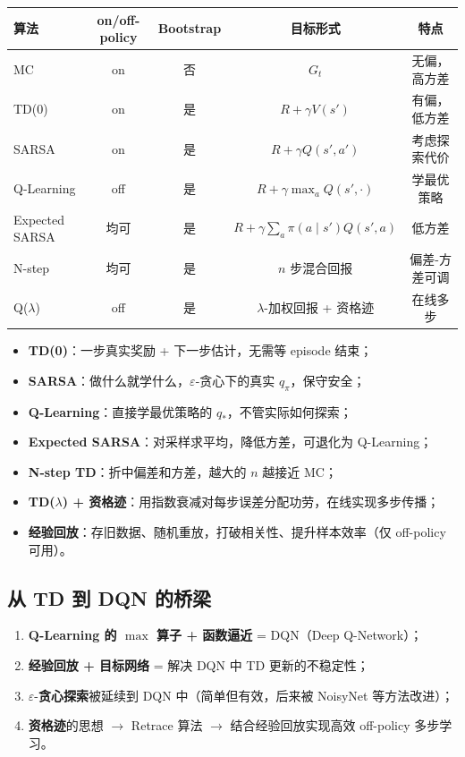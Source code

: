 \documentclass{article}
\begin{document}
\begin{center}
\begin{tabular}{lcccc}
\toprule
算法 & on/off-policy & Bootstrap & 目标形式 & 特点 \\
\midrule
MC & on & 否 & $G_t$ & 无偏，高方差 \\
TD(0) & on & 是 & $R+\gamma V(s')$ & 有偏，低方差 \\
SARSA & on & 是 & $R+\gamma Q(s',a')$ & 考虑探索代价 \\
Q-Learning & off & 是 & $R+\gamma\max_a Q(s',\cdot)$ & 学最优策略 \\
Expected SARSA & 均可 & 是 & $R+\gamma\sum_a\pi(a\mid s')Q(s',a)$ & 低方差 \\
N-step & 均可 & 是 & $n$ 步混合回报 & 偏差-方差可调 \\
Q($\lambda$) & off & 是 & $\lambda$-加权回报 + 资格迹 & 在线多步 \\
\bottomrule
\end{tabular}
\end{center}

\begin{itemize}
  \item \textbf{TD(0)}：一步真实奖励 + 下一步估计，无需等 episode 结束；
  \item \textbf{SARSA}：做什么就学什么，$\varepsilon$-贪心下的真实 $q_\pi$，保守安全；
  \item \textbf{Q-Learning}：直接学最优策略的 $q_*$，不管实际如何探索；
  \item \textbf{Expected SARSA}：对采样求平均，降低方差，可退化为 Q-Learning；
  \item \textbf{N-step TD}：折中偏差和方差，越大的 $n$ 越接近 MC；
  \item \textbf{TD($\lambda$) + 资格迹}：用指数衰减对每步误差分配功劳，在线实现多步传播；
  \item \textbf{经验回放}：存旧数据、随机重放，打破相关性、提升样本效率（仅 off-policy 可用）。
\end{itemize}

\subsection*{从 TD 到 DQN 的桥梁}

\begin{enumerate}
  \item \textbf{Q-Learning 的 $\max$ 算子 + 函数逼近} = DQN（Deep Q-Network）；
  \item \textbf{经验回放 + 目标网络} = 解决 DQN 中 TD 更新的不稳定性；
  \item $\varepsilon$-\textbf{贪心探索}被延续到 DQN 中（简单但有效，后来被 NoisyNet 等方法改进）；
  \item \textbf{资格迹}的思想 $\to$ Retrace 算法 $\to$ 结合经验回放实现高效 off-policy 多步学习。
\end{enumerate}
\end{document}
